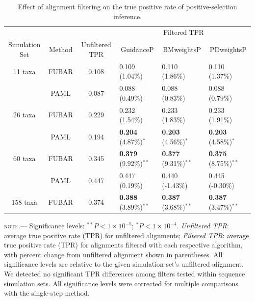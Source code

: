 \documentclass[10pt]{article}
\begin{document}
\begin{table}
\caption {\label{tab:casemodel} Effect of alignment filtering on the true positive rate of positive-selection inference.}
\begin{tabular}{c c c l l l}
\hline\noalign{\smallskip}
& & & \multicolumn{3}{c}{Filtered TPR} \\
\cline{4-6}\noalign{\smallskip}
Simulation Set & Method & Unfiltered TPR & \multicolumn{1}{c}{GuidanceP} & \multicolumn{1}{c}{BMweightsP} & \multicolumn{1}{c}{PDweightsP} \\ 
\hline\noalign{\smallskip}
11 taxa  & FUBAR & 0.108 & 0.109  (1.04\%)   & 0.110  (1.86\%)  & 0.110  (1.37\%)        \\
              & PAML &  0.087 & 0.088  (0.49\%) &  0.088  (0.83\%)   & 0.088  (0.79\%)        \\
\hline
26 taxa   & FUBAR &  0.229 & 0.232 (1.54\%)  & 0.233 (1.83\%) & 0.233 (1.91\%)         \\
              & PAML & 0.194 & \textbf{0.204} (4.87\%)$^{\ast}$ & \textbf{0.203} (4.56\%)$^{\ast}$ & \textbf{0.203} (4.58\%)$^{\ast}$   \\
\hline
60 taxa  & FUBAR & 0.345 & \textbf{0.379} (9.92\%)$^{\ast\ast}$ & \textbf{0.377} (9.31\%)$^{\ast\ast}$ & \textbf{0.375} (8.75\%)$^{\ast\ast}$  \\
              & PAML & 0.447 & 0.447 (0.19\%) & 0.440 (-1.43\%) & 0.445 (-0.30\%) \\
\hline
158 taxa & FUBAR & 0.374 & \textbf{0.388} (3.89\%)$^{\ast\ast}$ & \textbf{0.387} (3.68\%)$^{\ast\ast}$ & \textbf{0.387} (3.47\%)$^{\ast\ast}$  \\
\hline
\end{tabular}
\newline
\textsc{note.}--- Significance levels: $^{\ast\ast} P < 1\times10^{-5}$; $^{\ast} P < 1\times10^{-4}$. \textit{Unfiltered TPR}: average true positive rate (TPR) for unfiltered alignments; \textit{Filtered TPR}: average true positive rate (TPR) for alignments filtered with each respective algorithm, with percent change from unfiltered alignment shown in parentheses. All significance levels are relative to the given simulation set's unfiltered alignment. We detected no significant TPR differences among filters tested within sequence simulation sets. All significance levels were corrected for multiple comparisons with the single-step method.
\end{table}




	
\end{document}
